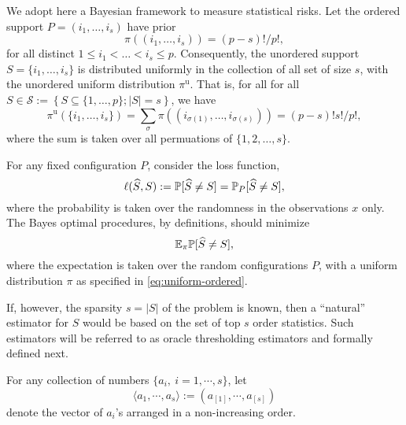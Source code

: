 We adopt here a Bayesian framework to measure statistical risks. 
Let the ordered support $P=(i_1,\ldots,i_s)$ have prior
\begin{equation} \label{eq:uniform-ordered}
\pi((i_1,\ldots, i_s)) = {(p-s)!}/{p!},
\end{equation}
for all distinct $1\le i_1 < \ldots < i_s\le p$.
Consequently, the unordered support $S=\{i_1,\ldots,i_s\}$ is distributed uniformly in the collection of all set of size $s$, with the unordered uniform distribution $\pi^{\text{u}}$. That is, for all for all $S\in\mathcal{S}:=\left\{S\subseteq\{1,\ldots,p\};|S|=s\right\}$, we have 
\begin{equation} \label{eq:uniform}
\pi^{\text{u}}
(\{i_1,\ldots, i_s\}) = \sum_{\sigma}\pi((i_{\sigma(1)},\ldots, i_{\sigma(s)})) = {(p-s)!s!}/{p!},
\end{equation}
where the sum is taken over all permuations of $\{1,2,\ldots,s\}$.

For any fixed configuration $P$, consider the loss function,
$$
\ell(\widehat{S},S) := \P[\widehat{S} \neq S] = \P_{P}[\widehat{S} \neq S],
$$
where the probability is taken over the randomness in the observations $x$ only.
The Bayes optimal procedures, by definitions, should minimize 
\begin{equation} \label{eq:Bayes-risk}
    \E_\pi \P[\widehat{S} \neq S],
\end{equation}
where the expectation is taken over the random configurations $P$, with a uniform distribution $\pi$ as specified in \eqref{eq:uniform-ordered}.


If, however, the sparsity $s = |S|$ of the problem is known, then a ``natural'' estimator for $S$ would be based on the set of top $s$ order statistics. Such estimators will be referred to as oracle thresholding estimators and formally defined next. 

For any collection of numbers $\{a_i,\ i=1,\cdots,s\}$, let 
$$
\langle a_1,\cdots,a_s\rangle := (a_{[1]},\cdots,a_{[s]})
$$
denote the vector of $a_i$'s arranged in a non-increasing order.

